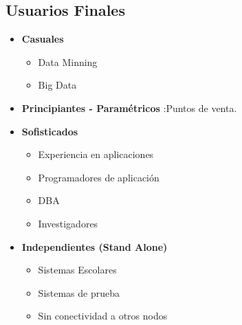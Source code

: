 \documentclass[12pt, fleqn]{report}                             %
\begin{document}
            \subsection{Usuarios Finales}
            \begin{itemize}
                    \item
                        \textbf{Casuales}

                        \begin{itemize}
                            \item Data Minning
                            \item Big Data
                        \end{itemize}

                    \item 
                        \textbf{Principiantes - Paramétricos}
                        :Puntos de venta.

                    \item 
                        \textbf{Sofisticados}
                        \begin{itemize}
                            \item Experiencia en aplicaciones 
                            \item Programadores de aplicación
                            \item DBA 
                            \item Investigadores
                         \end{itemize}
                        
                    \item 
                        \textbf{Independientes (Stand Alone)} 
                            \begin{itemize}
                                \item Sistemas Escolares
                                \item Sistemas de prueba
                                \item Sin conectividad a otros nodos
                            \end{itemize}

            \end{itemize}






        \clearpage
\end{document}
